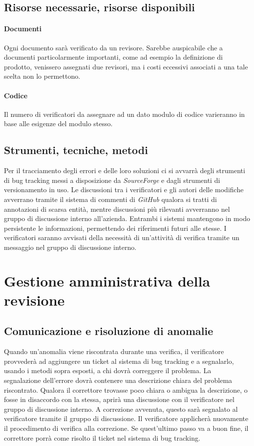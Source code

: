\documentclass[a4paper]{article}
\begin{document}
\subsection{Risorse necessarie, risorse disponibili}
\paragraph{Documenti} Ogni documento sar\`a verificato da un revisore. Sarebbe auspicabile che a documenti particolarmente importanti, come ad esempio la definizione di prodotto, venissero assegnati due revisori, ma i costi eccessivi associati a una tale scelta non lo permettono.
\paragraph{Codice} Il numero di verificatori da assegnare ad un dato modulo di codice varieranno in base alle esigenze del modulo stesso.

\subsection{Strumenti, tecniche, metodi}
Per il tracciamento degli errori e delle loro soluzioni ci si avvarr\`a degli strumenti di bug tracking messi a disposizione da \textit{SourceForge} e dagli strumenti di versionamento in uso. \linebreak
Le discussioni tra i verificatori e gli autori delle modifiche avverrano tramite il sistema di commenti di \textit{GitHub} qualora si tratti di annotazioni di scarsa entit\`a, mentre discussioni pi\`u rilevanti avverranno nel gruppo di discussione interno all'azienda. Entrambi i sistemi mantengono in modo persistente le informazioni, permettendo dei riferimenti futuri alle stesse.
\linebreak
I verificatori saranno avvisati della necessit\`a di un'attivit\`a di verifica tramite un messaggio nel gruppo di discussione interno. 


\section{Gestione amministrativa della revisione}

\subsection{Comunicazione e risoluzione di anomalie}
Quando un'anomalia viene riscontrata durante una verifica, il verificatore provveder\`a ad aggiungere un ticket al sistema di bug tracking e a segnalarlo, usando i metodi sopra esposti, a chi dovr\`a correggere il problema. La segnalazione dell'errore dovr\`a contenere una descrizione chiara del problema riscontrato. Qualora il correttore trovasse poco chiara o ambigua la descrizione, o fosse in disaccordo con la stessa, aprir\`a una discussione con il verificatore nel gruppo di discussione interno. A correzione avvenuta, questo sar\`a segnalato al verificatore tramite il gruppo di discussione. Il verificatore applicher\`a nuovamente il procedimento di verifica alla correzione. Se quest'ultimo passo va a buon fine, il correttore porr\`a come risolto il ticket nel sistema di bug tracking.
\end{document}
